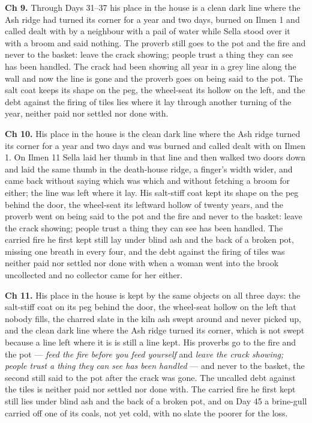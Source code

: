 \documentclass{design/chronicle}
\begin{document}
{\textbf{Ch 9.} Through Days 31–37 his place in the house is a clean dark line where the Ash ridge had turned its corner for a year and two days, burned on Ilmen 1 and called dealt with by a neighbour with a pail of water while Sella stood over it with a broom and said nothing. The proverb still goes to the pot and the fire and never to the basket: leave the crack showing; people trust a thing they can see has been handled. The crack had been showing all year in a grey line along the wall and now the line is gone and the proverb goes on being said to the pot. The salt coat keeps its shape on the peg, the wheel-seat its hollow on the left, and the debt against the firing of tiles lies where it lay through another turning of the year, neither paid nor settled nor done with.

\textbf{Ch 10.} His place in the house is the clean dark line where the Ash ridge turned its corner for a year and two days and was burned and called dealt with on Ilmen 1. On Ilmen 11 Sella laid her thumb in that line and then walked two doors down and laid the same thumb in the death-house ridge, a finger’s width wider, and came back without saying which was which and without fetching a broom for either; the line was left where it lay. His salt-stiff coat kept its shape on the peg behind the door, the wheel-seat its leftward hollow of twenty years, and the proverb went on being said to the pot and the fire and never to the basket: leave the crack showing; people trust a thing they can see has been handled. The carried fire he first kept still lay under blind ash and the back of a broken pot, missing one breath in every four, and the debt against the firing of tiles was neither paid nor settled nor done with when a woman went into the brook uncollected and no collector came for her either.

\textbf{Ch 11.} His place in the house is kept by the same objects on all three days: the salt-stiff coat on its peg behind the door, the wheel-seat hollow on the left that nobody fills, the charred slate in the kiln ash swept around and never picked up, and the clean dark line where the Ash ridge turned its corner, which is not swept because a line left where it is is still a line kept. His proverbs go to the fire and the pot --- \emph{feed the fire before you feed yourself} and \emph{leave the crack showing; people trust a thing they can see has been handled} --- and never to the basket, the second still said to the pot after the crack was gone. The uncalled debt against the tiles is neither paid nor settled nor done with. The carried fire he first kept still lies under blind ash and the back of a broken pot, and on Day 45 a brine-gull carried off one of its coals, not yet cold, with no slate the poorer for the loss.

}
\end{document}
